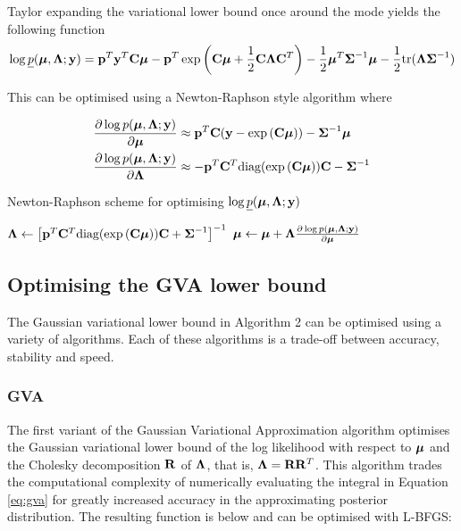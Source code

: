 \documentclass{article}[12pt]
\begin{document}
\noindent Taylor expanding the variational lower bound once around the mode yields the following function
\begin{align*}
\log \underline{p}({\boldsymbol \mu}, {\boldsymbol \Lambda}; {\bf y}) = {\bf p}^T{\bf y}^T{\bf C}{\boldsymbol \mu} - {\bf p}^T\exp \left ({\bf C} {\boldsymbol \mu} + {\frac{1}{2}} {\bf C} {\boldsymbol \Lambda} {\bf C}^T \right ) - {\frac{1}{2}} {\boldsymbol \mu}^T {\boldsymbol \Sigma}^{-1} {\boldsymbol \mu} - {\frac{1}{2}} \text{tr}{({\boldsymbol\Lambda}{\boldsymbol\Sigma}^{-1})}
\end{align*}

\noindent This can be optimised using a Newton-Raphson style algorithm where

\begin{align*}
\frac{\partial \log p({\boldsymbol \mu}, {\boldsymbol \Lambda}; {\bf y})}{\partial {\boldsymbol\mu}} &\approx {\bf p}^T{\bf C}({\bf y} - \exp{({\bf C}{\boldsymbol\mu})}) - {\boldsymbol \Sigma}^{-1} {\boldsymbol \mu} \\
\frac{\partial \log p({\boldsymbol \mu}, {\boldsymbol \Lambda}; {\bf y})}{\partial {\boldsymbol\Lambda}} &\approx -{\bf p}^T {\bf C}^T \text{diag}(\exp{({\bf C}{\boldsymbol\mu})}) {\bf C} - {\boldsymbol \Sigma}^{-1}
\end{align*}

\begin{algorithm}\label{alg:algorithm_three}
\caption[Algorithm 3]{Newton-Raphson scheme for optimising $\log \underline{p}({\boldsymbol \mu}, {\boldsymbol \Lambda}; {\bf y})$}
\begin{algorithmic}
\STATE ${\boldsymbol \Lambda} \leftarrow \left [{\bf p}^T {\bf C}^T \text{diag}(\exp{({\bf C}{\boldsymbol\mu})}) {\bf C} + {\boldsymbol \Sigma}^{-1} \right ]^{-1}$
\STATE ${\boldsymbol \mu} \leftarrow {\boldsymbol\mu} + {\boldsymbol \Lambda} \frac{\partial \log p({\boldsymbol \mu}, {\boldsymbol \Lambda}; {\bf y})}{\partial {\boldsymbol\mu}}$
\ENDWHILE
\end{algorithmic}
\end{algorithm}

\subsection{Optimising the GVA lower bound}
The Gaussian variational lower bound in Algorithm 2 can be optimised using a 
variety of algorithms. Each of these algorithms is a trade-off between accuracy, 
stability and speed.

\subsubsection{GVA}
The first variant of the Gaussian Variational Approximation algorithm
optimises the Gaussian variational lower bound of the log likelihood with respect
to ${\boldsymbol \mu}$ and the Cholesky decomposition ${\bf R}$ of ${\boldsymbol \Lambda}$, that is,
${\boldsymbol \Lambda} = {\bf R} {\bf R}^T$. This algorithm trades the computational complexity of 
numerically evaluating the integral in Equation \ref{eq:gva} for greatly increased 
accuracy in the approximating posterior distribution. The resulting function is below and 
can be optimised with L-BFGS:
\end{document}
